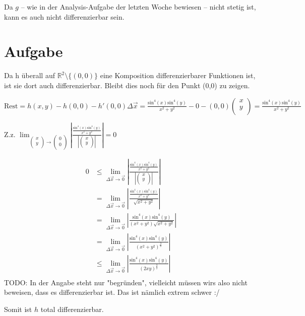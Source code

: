 \documentclass[10pt,a4paper,parskip=half]{scrartcl}
\newcommand{\vectwo}[2]{\left(\begin {array} {c} #1 \\ #2 \\ \end {array} \right)}
\begin{document}
\begin{enumerate}[(i)]
Da $g$ -- wie in der Analysis-Aufgabe der letzten Woche bewiesen -- nicht stetig ist, kann es auch nicht differenzierbar sein.
\section{Aufgabe}
Da h überall auf $\mathbb R^2\setminus{\{(0,0)\}}$ eine Komposition differenzierbarer Funktionen ist, ist sie dort auch differenzierbar. Bleibt dies noch für den Punkt (0,0) zu zeigen.

$\text{Rest} = h(x,y) - h(0,0) - h'(0,0) \Delta \vec x = \frac{\text{sin}^4(x)\text{sin}^4(y)}{x^2 + y^2} - 0 - (0,0) \vectwo{x}{y} = \frac{\text{sin}^4(x)\text{sin}^4(y)}{x^2 + y^2}$

Z.z. $\lim_{\vectwo{x}{y} \to \vectwo{0}{0}} \left|\frac{\frac{\text{sin}^4(x)\text{sin}^4(y)}{x^2 + y^2}}{\left|\vectwo{x}{y}\right|}\right| = 0$

\begin{align*}
0 &\le\lim_{\Delta \vec x \to \vec 0} \left|\frac{\frac{\text{sin}^4(x)\text{sin}^4(y)}{x^2 + y^2}}{\left|\vectwo{x}{y}\right|}\right| \\
&= \lim_{\Delta \vec x \to \vec 0} \left|\frac{\frac{\text{sin}^4(x)\text{sin}^4(y)}{x^2 + y^2}}{\sqrt{x^2+y^2}}\right| \\
&= \lim_{\Delta \vec x \to \vec 0} \left|\frac{\text{sin}^4(x)\text{sin}^4(y)}{(x^2 + y^2)\sqrt{x^2+y^2}}\right| \\
&= \lim_{\Delta \vec x \to \vec 0} \left|\frac{\text{sin}^4(x)\text{sin}^4(y)}{(x^2 + y^2)^{\frac{3}{2}}}\right| \\
&\le \lim_{\Delta \vec x \to \vec 0} \left|\frac{\text{sin}^4(x)\text{sin}^4(y)}{(2xy)^{\frac{3}{2}}}\right| \\
\end{align*}
TODO: In der Angabe steht nur "begründen", vielleicht müssen wirs also nicht beweisen, dass es differenzierbar ist. Das ist nämlich extrem schwer :/ 

Somit ist $h$ total differenzierbar.

%


\end{enumerate}
\end{document}
